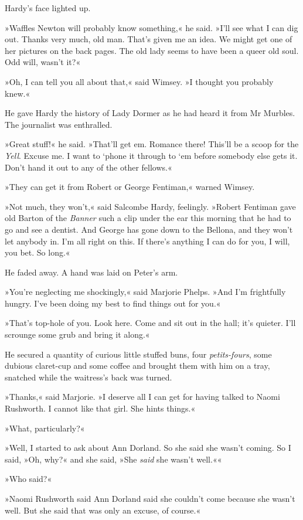 Hardy's face lighted up.

»Waffles Newton will probably know something,« he said. »I'll see what I can dig out. Thanks very much, old man. That's given me an idea. We might get one of her pictures on the back pages. The old lady seems to have been a queer old soul. Odd will, wasn't it?«

»Oh, I can tell you all about that,« said Wimsey. »I thought you probably knew.«

He gave Hardy the history of Lady Dormer as he had heard it from Mr Murbles. The journalist was enthralled.

»Great stuff!« he said. »That'll get em. Romance there! This'll be a scoop for the \textit{Yell}. Excuse me. I want to `phone it through to `em before somebody else gets it. Don't hand it out to any of the other fellows.«

»They can get it from Robert or George Fentiman,« warned Wimsey.

»Not much, they won't,« said Salcombe Hardy, feelingly. »Robert Fentiman gave old Barton of the \textit{Banner} such a clip under the ear this morning that he had to go and see a dentist. And George has gone down to the Bellona, and they won't let anybody in. I'm all right on this. If there's anything I can do for you, I will, you bet. So long.«

He faded away. A hand was laid on Peter's arm.

»You're neglecting me shockingly,« said Marjorie Phelps. »And I'm frightfully hungry. I've been doing my best to find things out for you.«

»That's top-hole of you. Look here. Come and sit out in the hall; it's quieter. I'll scrounge some grub and bring it along.«

He secured a quantity of curious little stuffed buns, four \textit{petits-fours}, some dubious claret-cup and some coffee and brought them with him on a tray, snatched while the waitress's back was turned.

»Thanks,« said Marjorie. »I deserve all I can get for having talked to Naomi Rushworth. I cannot like that girl. She hints things.«

»What, particularly?«

»Well, I started to ask about Ann Dorland. So she said she wasn't coming. So I said, »Oh, why?« and she said, »She \textit{said} she wasn't well.««

»Who said?«

»Naomi Rushworth said Ann Dorland said she couldn't come because she wasn't well. But she said that was only an excuse, of course.«

